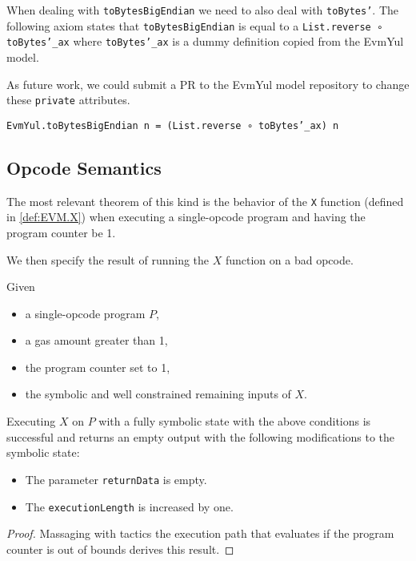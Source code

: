 When dealing with \texttt{toBytesBigEndian} we need to also deal with
\texttt{toBytes'}. The following axiom states that \texttt{toBytesBigEndian} is
equal to a \texttt{List.reverse ∘ toBytes'_ax} where \texttt{toBytes'_ax} is a
dummy definition copied from the EvmYul model.

As future work, we could submit a PR to the EvmYul model repository to change
these \texttt{private} attributes.

\begin{theorem}
\label{thm:toBytesBigEndian_rw}
\texttt{EvmYul.toBytesBigEndian n = (List.reverse ∘ toBytes'_ax) n}
\end{theorem}

\subsection{Opcode Semantics}

The most relevant theorem of this kind is the behavior of the \texttt{X}
function (defined in \ref{def:EVM.X}) when executing a single-opcode program and
having the program counter be 1.


We then specify the result of running the $X$ function on a bad opcode.

\begin{theorem}[X_bad_pc]\label{thm:X_bad_pc}\leanok
Given
\begin{itemize}
\item a single-opcode program $P$,
\item a gas amount greater than 1,
\item the program counter set to 1,
\item the symbolic and well constrained remaining inputs of $X$.
\end{itemize}
Executing $X$ on $P$ with a fully symbolic state with the above conditions
is successful and returns an empty output with the following modifications to
the symbolic state:
\begin{itemize}
\item The parameter \texttt{returnData} is empty.
\item The \texttt{executionLength} is increased by one.
\end{itemize}
\end{theorem}
\begin{proof}
\leanok
Massaging with tactics the execution path that evaluates if the program counter
is out of bounds derives this result.
\end{proof}

